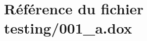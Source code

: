 \hypertarget{001__a_8dox}{}\section{Référence du fichier testing/001\+\_\+a.dox}
\label{001__a_8dox}
